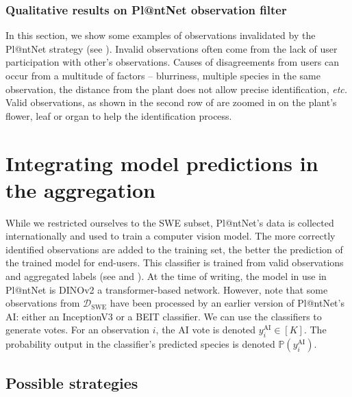 \subsubsection{Qualitative results on Pl@ntNet observation filter}

In this section, we show some examples of observations invalidated by the Pl@ntNet strategy (see ).
Invalid observations often come from the lack of user participation with other's observations.
Causes of disagreements from users can occur from a multitude of factors -- blurriness, multiple species in the same observation, the distance from the plant does not allow precise identification, \emph{etc.}
Valid observations, as shown in the second row of  are zoomed in on the plant's flower, leaf or organ to help the identification process.

\section{Integrating model predictions in the aggregation}

While we restricted ourselves to the SWE subset, Pl@ntNet's data is collected internationally and used to train a computer vision model.
The more correctly identified observations are added to the training set, the better the prediction of the trained model for end-users.
This classifier is trained from valid observations and aggregated labels (see  and ).
At the time of writing, the model in use in Pl@ntNet is DINOv2 \citep{oquab2024dinov2} a transformer-based network.
However, note that some observations from $\mathcal{D}_{\text{SWE}}$ have been processed by an earlier version of Pl@ntNet's AI: either an InceptionV3 \citep{szegedy2015rethinking} or a BEIT \citep{bao2021beit} classifier.
We can use the classifiers to generate votes.
For an observation $i$, the AI vote is denoted $y_i^{\text{AI}}\in[K]$. The probability output in the classifier's predicted species is denoted $\mathbb{P}(y_i^{\text{AI}})$.

\subsection{Possible strategies}
\label{sub:strats_ai}

